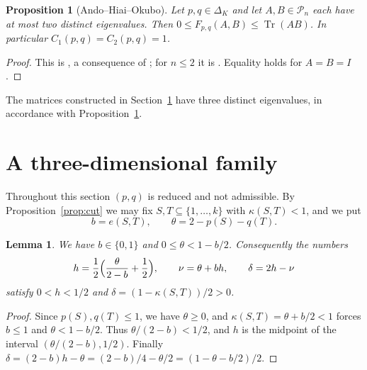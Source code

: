 \documentclass{amsart}
\newtheorem{proposition}[theorem]{Proposition}
\newtheorem{lemma}[theorem]{Lemma}
\theoremstyle{definition}
\theoremstyle{remark}
\numberwithin{equation}{section}
\newcommand{\Tr}{\operatorname{Tr}}
\newcommand{\PSD}{\mathcal{P}_n}
\newcommand{\cut}{\kappa}
\begin{document}
\begin{proposition}[Ando--Hiai--Okubo]\label{prop:twoeig}
Let $p,q\in\Delta_K$ and let $A,B\in\PSD$ each have at most two distinct eigenvalues. Then $0\le F_{p,q}(A,B)\le\Tr(AB)$. In particular $C_1(p,q)=C_2(p,q)=1$.
\end{proposition}

\begin{proof}
This is \cite[Corollary~4.3(i)]{AHO}, a consequence of \cite[Theorem~4.1]{AHO}; for $n\le 2$ it is \cite[Corollary~4.4(i)]{AHO}. Equality holds for $A=B=I$.
\end{proof}

The matrices constructed in Section~\ref{sec:family} have three distinct eigenvalues, in accordance with Proposition~\ref{prop:twoeig}.

\section{A three-dimensional family}\label{sec:family}

Throughout this section $(p,q)$ is reduced and not admissible. By Proposition~\ref{prop:cut} we may fix $S,T\subseteq\{1,\dots,k\}$ with $\cut(S,T)<1$, and we put
\[
b=e(S,T),\qquad\theta=2-p(S)-q(T).
\]

\begin{lemma}\label{lem:parameters}
We have $b\in\{0,1\}$ and $0\le\theta<1-b/2$. Consequently the numbers
\[
h=\frac12\Bigl(\frac{\theta}{2-b}+\frac12\Bigr),\qquad\nu=\theta+bh,\qquad\delta=2h-\nu
\]
satisfy $0<h<1/2$ and $\delta=(1-\cut(S,T))/2>0$.
\end{lemma}

\begin{proof}
Since $p(S),q(T)\le 1$, we have $\theta\ge 0$, and $\cut(S,T)=\theta+b/2<1$ forces $b\le 1$ and $\theta<1-b/2$. Thus $\theta/(2-b)<1/2$, and $h$ is the midpoint of the interval $(\theta/(2-b),1/2)$. Finally $\delta=(2-b)h-\theta=(2-b)/4-\theta/2=(1-\theta-b/2)/2$.
\end{proof}
\end{document}
